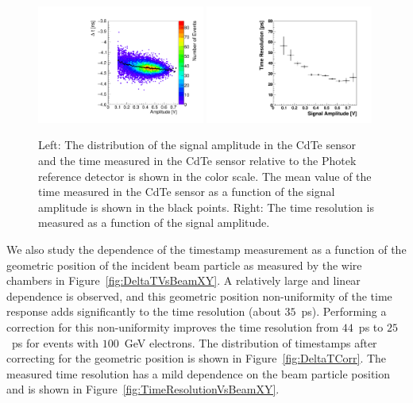 \begin{figure}[htbp] 
\centering
\includegraphics[width=0.49\textwidth]{figures/100GeV_deltaTVsAmp.pdf} 
\includegraphics[width=0.49\textwidth]{figures/TimeResolutionVsAmplitude.pdf} 
\caption{ Left: The distribution of the signal amplitude in the CdTe sensor and 
the time measured in the CdTe sensor relative to the Photek reference detector
is shown in the color scale. The mean value of the time measured in the CdTe sensor 
as a function of the signal amplitude is shown in the black points. Right: The
time resolution is measured as a function of the signal amplitude. } 
\label{fig:DeltaTVsAmplitude} 
\end{figure} 


We also study the dependence of the timestamp measurement as a function of the geometric
position of the incident beam particle as measured by the wire chambers in 
Figure~\ref{fig:DeltaTVsBeamXY}. A relatively large and linear dependence is observed, 
and this geometric position non-uniformity of the time response adds significantly to the 
time resolution (about $35$~ps). Performing a correction for this non-uniformity improves
the time resolution from $44$~ps to $25$~ps for events with $100$~GeV electrons.
The distribution of timestamps after correcting for the geometric position is shown
in Figure~\ref{fig:DeltaTCorr}. The measured time resolution has a mild dependence on 
the beam particle position and is shown in Figure~\ref{fig:TimeResolutionVsBeamXY}.

